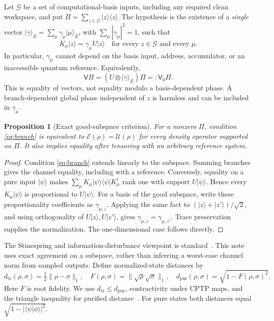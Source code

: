 \documentclass[11pt]{article}
\newtheorem{proposition}[theorem]{Proposition}
\newcommand{\ket}[1]{\lvert #1\rangle}
\newcommand{\bra}[1]{\langle #1\rvert}
\newcommand{\Dtr}{d_{\mathrm{tr}}}
\newcommand{\Dpur}{d_{\mathrm{pur}}}
\newcommand{\good}{\mathcal G}
\newcommand{\EE}{\mathcal E}
\newcommand{\UU}{\mathcal U}
\newcommand{\VV}{\mathsf V}
\begin{document}
Let $\good$ be a set of computational-basis inputs, including any required clean workspace, and put $\Pi=\sum_{z\in\good}\ket z\bra z$. The hypothesis is the existence of a \emph{single} vector $\ket\gamma_E=\sum_\mu\gamma_\mu\ket\mu_E$, with $\sum_\mu|\gamma_\mu|^2=1$, such that
\begin{equation}
 K_\mu\ket z=\gamma_\mu U\ket z
 \quad\text{for every $z\in\good$ and every $\mu$}.
 \label{eq:branch}
\end{equation}
In particular, $\gamma_\mu$ cannot depend on the basis input, address, accumulator, or an inaccessible quantum reference. Equivalently,
\begin{equation}
 \VV\Pi=(U\otimes\ket\gamma_E)\Pi=:\VV_0\Pi.
 \label{eq:environment}
\end{equation}
This is equality of vectors, not equality modulo a basis-dependent phase. A branch-dependent global phase independent of $z$ is harmless and can be included in $\gamma_\mu$.

\begin{proposition}[Exact good-subspace criterion]
For a nonzero $\Pi$, condition \eqref{eq:branch} is equivalent to $\EE(\rho)=\UU(\rho)$ for every density operator supported on $\Pi$. It also implies equality after tensoring with an arbitrary reference system.
\end{proposition}
\begin{proof}
Condition \eqref{eq:branch} extends linearly to the subspace. Summing branches gives the channel equality, including with a reference. Conversely, equality on a pure input $\ket\psi$ makes $\sum_\mu K_\mu\ket\psi\bra\psi K_\mu^\dagger$ rank one with support $U\ket\psi$. Hence every $K_\mu\ket\psi$ is proportional to $U\ket\psi$. For a basis of the good subspace, write these proportionality coefficients as $\gamma_{\mu,z}$. Applying the same fact to $(\ket z+\ket{z'})/\sqrt2$, and using orthogonality of $U\ket z,U\ket{z'}$, gives $\gamma_{\mu,z}=\gamma_{\mu,z'}$. Trace preservation supplies the normalization. The one-dimensional case follows directly.
\end{proof}

The Stinespring and information-disturbance viewpoint is standard~\cite{ksw}. This note uses exact agreement on a subspace, rather than inferring a worst-case channel norm from sampled outputs. Define normalized-state distances by
\begin{equation}
 \Dtr(\rho,\sigma)=\tfrac12\|\rho-\sigma\|_1,
 \quad F(\rho,\sigma)=\|\sqrt\rho\sqrt\sigma\|_1,
 \quad \Dpur(\rho,\sigma)=\sqrt{1-F(\rho,\sigma)^2}.
\end{equation}
Here $F$ is root fidelity. We use $\Dtr\leq\Dpur$, contractivity under CPTP maps, and the triangle inequality for purified distance~\cite{fvdg,tcr}. For pure states both distances equal $\sqrt{1-|\langle\psi|\phi\rangle|^2}$.
\end{document}
